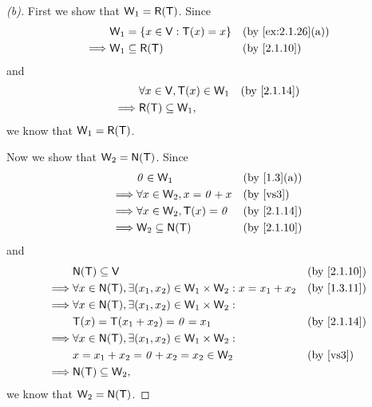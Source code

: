 \begin{proof}[(b)]
  First we show that \(\W_1 = \rg{\T}\).
  Since
  \begin{align*}
             & \W_1 = \set{x \in \V : \T(x) = x} &  & \text{(by \cref{ex:2.1.26}(a))} \\
    \implies & \W_1 \subseteq \rg{\T}            &  & \text{(by \cref{2.1.10})}
  \end{align*}
  and
  \begin{align*}
             & \forall x \in \V, \T(x) \in \W_1 &  & \text{(by \cref{2.1.14})} \\
    \implies & \rg{\T} \subseteq \W_1,
  \end{align*}
  we know that \(\W_1 = \rg{\T}\).

  Now we show that \(\W_2 = \ns{\T}\).
  Since
  \begin{align*}
             & \zv \in \W_1                    &  & \text{(by \cref{1.3}(a))} \\
    \implies & \forall x \in \W_2, x = \zv + x &  & \text{(by \ref{vs3})}     \\
    \implies & \forall x \in \W_2, \T(x) = \zv &  & \text{(by \cref{2.1.14})} \\
    \implies & \W_2 \subseteq \ns{\T}          &  & \text{(by \cref{2.1.10})}
  \end{align*}
  and
  \begin{align*}
             & \ns{\T} \subseteq \V                                                           &  & \text{(by \cref{2.1.10})} \\
    \implies & \forall x \in \ns{\T}, \exists (x_1, x_2) \in \W_1 \times \W_2 : x = x_1 + x_2 &  & \text{(by \cref{1.3.11})} \\
    \implies & \forall x \in \ns{\T}, \exists (x_1, x_2) \in \W_1 \times \W_2 :                                              \\
             & \T(x) = \T(x_1 + x_2) = \zv = x_1                                              &  & \text{(by \cref{2.1.14})} \\
    \implies & \forall x \in \ns{\T}, \exists (x_1, x_2) \in \W_1 \times \W_2 :                                              \\
             & x = x_1 + x_2 = \zv + x_2 = x_2 \in \W_2                                       &  & \text{(by \ref{vs3})}     \\
    \implies & \ns{\T} \subseteq \W_2,
  \end{align*}
  we know that \(\W_2 = \ns{\T}\).
\end{proof}

